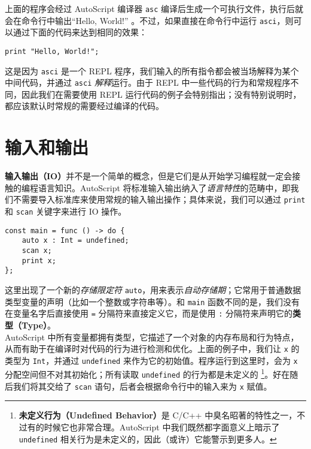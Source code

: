 上面的程序会经过 AutoScript 编译器 \lstinline!asc! 编译后生成一个可执行文件，执行后就会在命令行中输出“Hello, World!” 。不过，如果直接在命令行中运行 \lstinline!asci!，则可以通过下面的代码来达到相同的效果：

\begin{lstlisting}
print "Hello, World!";
\end{lstlisting}

这是因为 \lstinline!asci! 是一个 REPL 程序，我们输入的所有指令都会被当场解释为某个中间代码，并通过 \lstinline!asci! \emph{解释}运行。由于 REPL 中一些代码的行为和常规程序不同，因此我们在需要使用 REPL 运行代码的例子会特别指出；没有特别说明时，都应该默认时常规的需要经过编译的代码。


\section{输入和输出}

\textbf{输入输出（IO）}并不是一个简单的概念，但是它们是从开始学习编程就一定会接触的编程语言知识。AutoScript 将标准输入输出纳入了\emph{语言特性}的范畴中，即我们不需要导入标准库来使用常规的输入输出操作；具体来说，我们可以通过 \lstinline!print! 和 \lstinline!scan! 关键字来进行 IO 操作。

\begin{lstlisting}
const main = func () -> do {
    auto x : Int = undefined;
    scan x;
    print x;
};
\end{lstlisting}

这里出现了一个新的\emph{存储限定符} \lstinline!auto!，用来表示\emph{自动存储期}；它常用于普通数据类型变量的声明（比如一个整数或字符串等）。和 \lstinline!main! 函数不同的是，我们没有在变量名字后直接使用 \lstinline!=! 分隔符来直接定义它，而是使用 \lstinline!:! 分隔符来声明它的\textbf{类型（Type）}。 \\

AutoScript 中所有变量都拥有类型，它描述了一个对象的内存布局和行为特点，从而有助于在编译时对代码的行为进行检测和优化。上面的例子中，我们让 \lstinline!x! 的类型为 \lstinline!Int!，并通过 \lstinline!undefined! 来作为它的初始值。程序运行到这里时，会为 \lstinline!x! 分配空间但不对其初始化；所有读取 \lstinline!undefined! 的行为都是未定义的 \footnote{\textbf{未定义行为（Undefined Behavior）}是 C/C++ 中臭名昭著的特性之一，不过有的时候它也非常合理。AutoScript 中我们既然都字面意义上暗示了 \lstinline!undefined! 相关行为是未定义的，因此（或许）它能警示到更多人。}。好在随后我们将其交给了 \lstinline!scan! 语句，后者会根据命令行中的输入来为 \lstinline!x! 赋值。 \\

